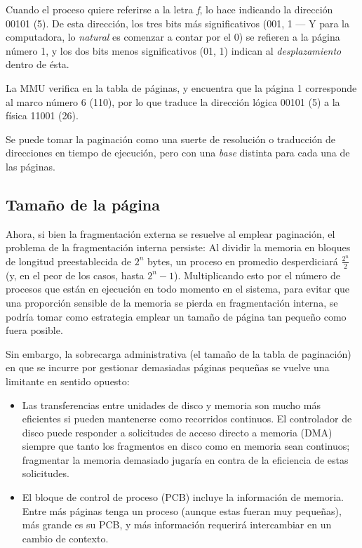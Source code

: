 \documentclass[11pt,fleqn]{book} %
\begin{document}
Cuando el proceso quiere referirse a la letra \emph{f}, lo hace indicando
la dirección 00101 (5). De esta dirección, los tres bits más
significativos (001, 1 — Y para la computadora, lo
\emph{natural} es comenzar a contar por el 0) se refieren a la página
número 1, y los dos bits menos significativos (01, 1) indican al
\emph{desplazamiento} dentro de ésta.

La MMU verifica en la tabla de páginas, y encuentra que la página 1
corresponde al marco número 6 (110), por lo que traduce la dirección
lógica 00101 (5) a la física 11001 (26).

Se puede tomar la paginación como una suerte de resolución o traducción de
direcciones en tiempo de ejecución, pero con una \emph{base} distinta para
cada una de las páginas.
\subsection{Tamaño de la página}
\label{sec-5-4-1}


Ahora, si bien la fragmentación externa se resuelve al emplear
paginación, el problema de la fragmentación interna persiste: Al
dividir la memoria en bloques de longitud preestablecida de $2^n$
bytes, un proceso en promedio desperdiciará $\frac{2^n}{2}$ (y, en el
peor de los casos, hasta $2^n - 1$). Multiplicando esto por el número
de procesos que están en ejecución en todo momento en el sistema, para
evitar que una proporción sensible de la memoria se pierda en
fragmentación interna, se podría tomar como estrategia  emplear un tamaño
de página tan pequeño como fuera posible.

Sin embargo, la sobrecarga administrativa (el tamaño de la tabla de paginación) 
en que se incurre por
gestionar demasiadas páginas pequeñas se vuelve una limitante en
sentido opuesto:

\begin{itemize}
\item Las transferencias entre unidades de disco y memoria son mucho más
  eficientes si pueden mantenerse como recorridos continuos. El
  controlador de disco puede responder a solicitudes de acceso directo
  a memoria (DMA) siempre que tanto los fragmentos en disco como en
  memoria sean continuos; fragmentar la memoria demasiado jugaría en
  contra de la eficiencia de estas solicitudes.
\item El bloque de control de proceso (PCB) incluye la información de
  memoria. Entre más páginas tenga un proceso (aunque estas fueran muy
  pequeñas), más grande es su PCB, y más información requerirá
  intercambiar en un cambio de contexto.
\end{itemize}
\end{document}
